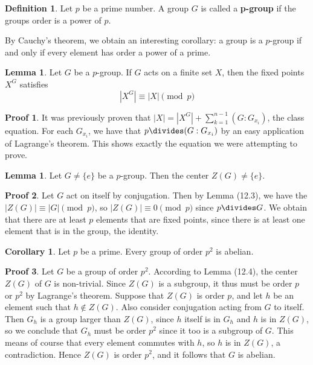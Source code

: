 \documentclass[12pt]{amsbook}
\theoremstyle{definition}
\newtheorem{lemma}[theorem]{Lemma}
\newtheorem{corollary}[theorem]{Corollary}
\newtheorem{definition}{Definition}
\newtheorem*{prf}{Proof}
\begin{document}
\begin{definition}
    Let $p$ be a prime number. A group $G$ is called a {\bf p-group}  if the groups order is a power of $p$.
\end{definition}

By Cauchy's theorem, we obtain an interesting corollary: a group is a $p$-group if and only if every element has order a power of a prime.

\begin{lemma}
    Let $G$ be a $p$-group. If $G$ acts on a finite set $X$, then the fixed points $X^G$ satisfies
    \[ |X^G| \equiv |X| \pmod{p} \]
\end{lemma}
\begin{prf}
    It was previously proven that $|X| = |X^G| + \sum_{k=1}^{n-1} (G:G_{x_i})$, the class equation. For each $G_{x_i}$, we have that $p \divides (G:G_{x_i})$ by an easy application of Lagrange's theorem. This shows exactly the equation we were attempting to prove.
\end{prf}

\begin{lemma}
    Let $G \neq \{e\}$ be a $p$-group. Then the center $Z(G) \neq \{e\}$.
\end{lemma}
\begin{prf}
    Let $G$ act on itself by conjugation. Then by Lemma (12.3), we have the $|Z(G)| \equiv |G| \pmod{p}$, so $|Z(G)| \equiv 0 \pmod{p}$ since $p \divides G$. We obtain that there are at least $p$ elements that are fixed points, since there is at least one element that is in the group, the identity.
\end{prf}

\begin{corollary}
    Let $p$ be a prime. Every group of order $p^2$ is abelian.
\end{corollary}
\begin{prf}
    Let $G$ be a group of order $p^2$. According to Lemma (12.4), the center $Z(G)$ of $G$ is non-trivial. Since $Z(G)$ is a subgroup, it thus must be order $p$ or $p^2$ by Lagrange's theorem. Suppose that $Z(G)$ is order $p$, and let $h$ be an element such that $h \notin Z(G)$. Also consider conjugation acting from $G$ to itself. Then $G_h$ is a group larger than $Z(G)$, since $h$ itself is in $G_h$ and $h$ is in $Z(G)$, so we conclude that $G_h$ must be order $p^2$ since it too is a subgroup of $G$. This means of course that every element commutes with $h$, so $h$ is in $Z(G)$, a contradiction. Hence $Z(G)$ is order $p^2$, and it follows that $G$ is abelian.
\end{prf}
\end{document}
